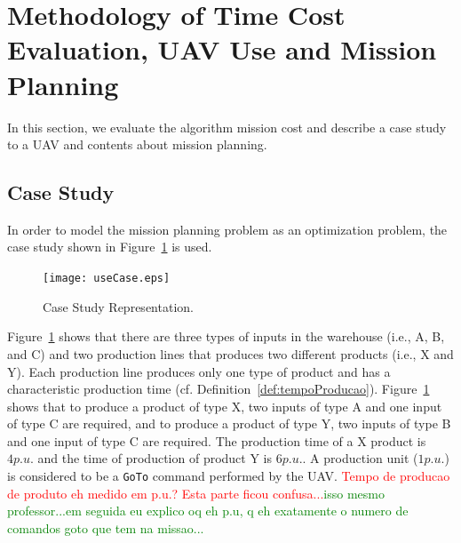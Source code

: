 \documentclass[conference,harvard,brazil,english]{sbatex}
\newcommand{\commentib}[1]{{\color{blue} [IB: #1]}}
\begin{document}


\section{Methodology of Time Cost Evaluation, UAV Use and Mission Planning}
\label{sec:method}


In this section, we evaluate the algorithm mission cost and describe a case study to a UAV and contents about mission planning.

\subsection{Case Study}
\label{sec:ec}

In order to model the mission planning problem as an optimization problem, the case study shown in Figure~\ref{fig:useCase} is used.
%
\begin{figure}[ht]
	\centering
	\texttt{[image: useCase.eps]}
	\caption{Case Study Representation.\label{fig:useCase}}
\end{figure}
	
Figure~\ref{fig:useCase} shows that there are three types of inputs in the warehouse (i.e., A, B, and C) and two production lines that produces two different products (i.e., X and Y). Each production line produces only one type of product and has a characteristic production time (cf. Definition~\ref{def:tempoProducao}). Figure~\ref{fig:useCase} shows that to produce a product of type X, two inputs of type A and one input of type C are required, and to produce a product of type Y, two inputs of type B and one input of type C are required. The production time of a X product is $4 p.u.$ and the time of production of product Y is $6 p.u.$. A production unit ($1 p.u.$) is considered to be a \texttt{GoTo} command performed by the UAV. \textcolor{red}{Tempo de producao de produto eh medido em p.u.? Esta parte ficou confusa...}\textcolor{green}{isso mesmo professor...em seguida eu explico oq eh p.u, q eh exatamente o numero de comandos goto que tem na missao...}
\end{document}
